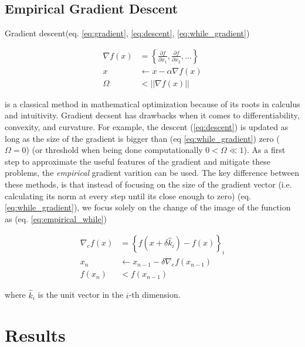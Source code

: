 \documentclass{article}
\begin{document}
        \subsection{Empirical Gradient Descent}

            Gradient descent(eq. \ref{eq:gradient}, \ref{eq:descent}, \ref{eq:while_gradient})
            
            \begin{align}
                \label{eq:gradient} \nabla f(x) &= \left\{ \frac{\partial f}{\partial x_1}, \frac{\partial f}{\partial x_2}, \ldots\right\} \\
                \label{eq:descent} x &\leftarrow x - \alpha \nabla f(x) \\
                \label{eq:while_gradient} \Omega &< ||\nabla f(x)||
            \end{align}
            
            is a classical method in mathematical optimization because of its roots in calculus and intuitivity.  Gradient decsent has drawbacks when it comes to differentiability,  convexity, and curvature.  For example, the descent (\ref{eq:descent}) is updated as long as the size of the gradient is bigger than (eq \ref{eq:while_gradient}) zero ($\Omega = 0$) (or threshold when being done computationally $0 < \Omega \ll 1$).  As a first step to approximate the useful features of the gradient and mitigate these problems, the \emph{empirical} gradient varition can be used.  The key difference between these methods, is that instead of focusing on the size of the gradient vector (i.e. calculating its norm at every step until its close enough to zero) (eq. \ref{eq:while_gradient}), we focus solely on the change of the image of the function as (eq. \ref{eq:empirical_while})

            \begin{align}
                \label{eq:empirical_gradient} \nabla_e f(x) &= \left\{f\left(x + \delta \hat{k}_i\right) - f\left(x\right)\right\}_i \\
                \label{empirical_descent} x_{n} &\leftarrow x_{n-1} - \delta \nabla_e f(x_{n-1}) \\
                \label{eq:empirical_while} f(x_{n}) &< f(x_{n-1})
            \end{align}

            where $\hat{k}_i$ is the unit vector in the $i$-th dimension.

    \section{Results}
\end{document}
